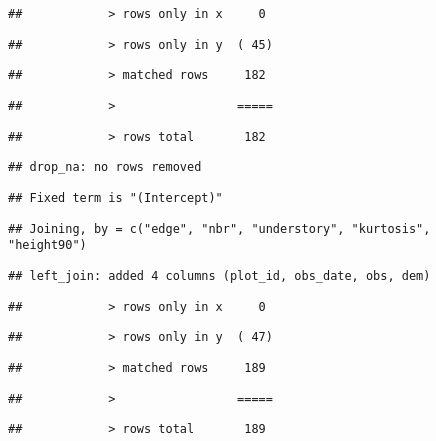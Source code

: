 \documentclass[
]{article}
\begin{document}
\begin{verbatim}
##            > rows only in x     0
\end{verbatim}

\begin{verbatim}
##            > rows only in y  ( 45)
\end{verbatim}

\begin{verbatim}
##            > matched rows     182
\end{verbatim}

\begin{verbatim}
##            >                 =====
\end{verbatim}

\begin{verbatim}
##            > rows total       182
\end{verbatim}

\begin{verbatim}
## drop_na: no rows removed
\end{verbatim}

\begin{verbatim}
## Fixed term is "(Intercept)"
\end{verbatim}

\begin{verbatim}
## Joining, by = c("edge", "nbr", "understory", "kurtosis", "height90")
\end{verbatim}

\begin{verbatim}
## left_join: added 4 columns (plot_id, obs_date, obs, dem)
\end{verbatim}

\begin{verbatim}
##            > rows only in x     0
\end{verbatim}

\begin{verbatim}
##            > rows only in y  ( 47)
\end{verbatim}

\begin{verbatim}
##            > matched rows     189
\end{verbatim}

\begin{verbatim}
##            >                 =====
\end{verbatim}

\begin{verbatim}
##            > rows total       189
\end{verbatim}
\end{document}
